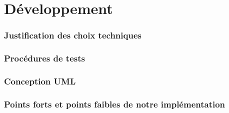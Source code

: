 \part{Développement}
\section{Justification des choix techniques}
\section{Procédures de tests}
\section{Conception UML}
\section{Points forts et points faibles de notre implémentation}
